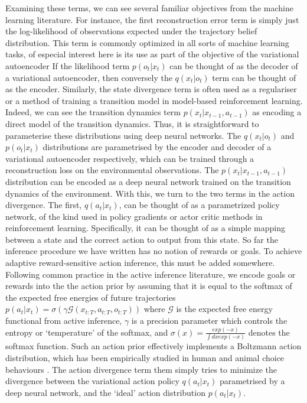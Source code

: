 Examining these terms, we can see several familiar objectives from the machine learning literature. For instance, the first reconstruction error term is simply just the log-likelihood of observations expected under the trajectory belief distribution. This term is commonly optimized in all sorts of machine learning tasks, of especial interest here is its use as part of the objective of the variational autoencoder \citep{kingma_auto-encoding_2013} If the likelihood term $p(o_t | x_t)$ can be thought of as the decoder of a variational autoencoder, then conversely the $q(x_t | o_t)$ term can be thought of as the encoder. Similarly, the state divergence term is often used as a regulariser or a method of training a transition model in model-based reinforcement learning. Indeed, we can see the transition dynamics term $p(x_t | x_{t-1}, a_{t-1})$ as encoding a direct model of the transition dynamics. Thus, it is straightforward to parameterise these distributions using deep neural networks. The $q(x_t | o_t)$ and $p(o_t | x_t)$ distributions are parametrised by the encoder and decoder of a variational autoencoder respectively, which can be trained through a reconstruction loss on the environmental observations. The $p(x_t | x_{t-1}, a_{t-1})$ distribution can be encoded as a deep neural network trained on the transition dynamics of the environment. With this, we turn to the two terms in the action divergence. The first, $q(a_t | x_t)$, can be thought of as a parametrized policy network, of the kind used in policy gradients or actor critic methods in reinforcement learning. Specifically, it can be thought of as a simple mapping between a state and the correct action to output from this state. So far the inference procedure we have written has no notion of rewards or goals. To achieve adaptive reward-sensitive action inference, this must be added somewhere. Following common practice in the active inference literature, we encode goals or rewards into the
the action prior by assuming that it is equal to the softmax of the expected free energies of future trajectories $p(a_t | x_t) = \sigma(\gamma \mathcal{G}(x_{t:T}, a_{t:T}, o_{t:T}))$ where $\mathcal{G}$ is the expected free energy functional from active inference, $\gamma$ is a precision parameter which controls the entropy or `temperature' of the softmax, and $\sigma(x) = \frac{exp(-x)}{\int dx exp(-x)}$ denotes the softmax function. Such an action prior effectively implements a Boltzmann action distribution, which has been empirically studied in human and animal choice behaviours \citep{daw2006cortical}. The action divergence term them simply tries to minimize the divergence between the variational action policy $q(a_t | x_t)$ parametrised by a deep neural network, and the `ideal' action distribution $p(a_t | x_t)$.

